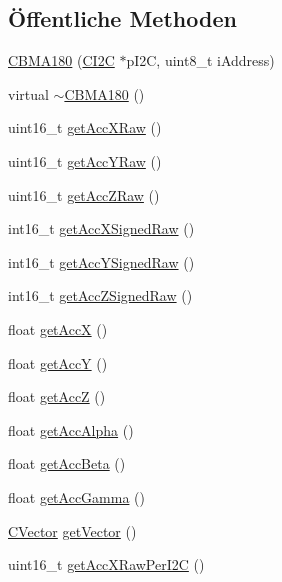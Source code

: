\subsection*{Öffentliche \-Methoden}
\begin{DoxyCompactItemize}
\item 
\hyperlink{class_c_b_m_a180_a4f07fb4e031d55899dda017623301cfd}{\-C\-B\-M\-A180} (\hyperlink{class_c_i2_c}{\-C\-I2\-C} $\ast$p\-I2\-C, uint8\-\_\-t i\-Address)
\item 
virtual \hyperlink{class_c_b_m_a180_a4ee1ab160be5e9839ec62045283d9b63}{$\sim$\-C\-B\-M\-A180} ()
\item 
uint16\-\_\-t \hyperlink{class_c_b_m_a180_af45e95b6cef3448e758cf9c407b219cf}{get\-Acc\-X\-Raw} ()
\item 
uint16\-\_\-t \hyperlink{class_c_b_m_a180_af21a35191db52dee7c271d44da42bd2f}{get\-Acc\-Y\-Raw} ()
\item 
uint16\-\_\-t \hyperlink{class_c_b_m_a180_a5f4f8579e3eb267ad3b1ac828a99ece8}{get\-Acc\-Z\-Raw} ()
\item 
int16\-\_\-t \hyperlink{class_c_b_m_a180_aafcebbbc6fa319c83467ea2918360802}{get\-Acc\-X\-Signed\-Raw} ()
\item 
int16\-\_\-t \hyperlink{class_c_b_m_a180_a05accbd8a3ddf864c41bc1ef9cfb1590}{get\-Acc\-Y\-Signed\-Raw} ()
\item 
int16\-\_\-t \hyperlink{class_c_b_m_a180_af2f8ed8bdbbaa33ea051de0b4690f49b}{get\-Acc\-Z\-Signed\-Raw} ()
\item 
float \hyperlink{class_c_b_m_a180_a7e1b7e8a3dc7e35d660285648bbf2cd8}{get\-Acc\-X} ()
\item 
float \hyperlink{class_c_b_m_a180_a15562c533c3e3ecf09ee6434ad9ba349}{get\-Acc\-Y} ()
\item 
float \hyperlink{class_c_b_m_a180_a13878be864d0c1c86fb5da9a7bed1bef}{get\-Acc\-Z} ()
\item 
float \hyperlink{class_c_b_m_a180_a1479e687581a037339e5db0a26183069}{get\-Acc\-Alpha} ()
\item 
float \hyperlink{class_c_b_m_a180_a1eb83ff966920cba25c3506f90cc36f1}{get\-Acc\-Beta} ()
\item 
float \hyperlink{class_c_b_m_a180_aaef74ead21abf6fc87647ad5f63c5a03}{get\-Acc\-Gamma} ()
\item 
\hyperlink{class_c_vector}{\-C\-Vector} \hyperlink{class_c_b_m_a180_ac9344e2d63aee2f5a1ad23156e2bbfc0}{get\-Vector} ()
\item 
uint16\-\_\-t \hyperlink{class_c_b_m_a180_a989e2bdc2ac1fc5e228d469c7ed99187}{get\-Acc\-X\-Raw\-Per\-I2\-C} ()

\end{DoxyCompactItemize}
